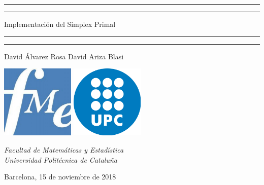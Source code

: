 \documentclass[11pt]{article}
\begin{document}
\begin{titlepage}
  \centering
  \sc \LARGE

  \vspace*{1cm}

  \rule{\textwidth}{1.6pt}\vspace*{-\baselineskip}\vspace*{2pt}
  \rule{\textwidth}{0.4pt}
  \vspace{-.25cm}

  Implementación del Simplex Primal

  \rule{\textwidth}{0.4pt}\vspace*{-\baselineskip}\vspace*{3.2pt}
  \rule{\textwidth}{1.6pt}
  \vspace{1cm}

  \Large
  David Álvarez Rosa \hspace{1cm} David Ariza Blasi
  \vfill

  \includegraphics[height=3.5cm]{Logo_FME.jpeg} \hspace{1.5cm}
  \includegraphics[height=3.5cm]{Logo_UPC.png}
  \vspace{1cm}

  \textit{Facultad de Matemáticas y Estadística} \\
  \textit{Universidad Politécnica de Cataluña}
  \vfill

  \large
  Barcelona, 15 de noviembre de 2018
\end{titlepage}


\thispagestyle{empty}
\vspace*{\fill}
\tableofcontents
\vfill
\vspace{.75cm}
\newpage
\setcounter{page}{1}
\end{document}
